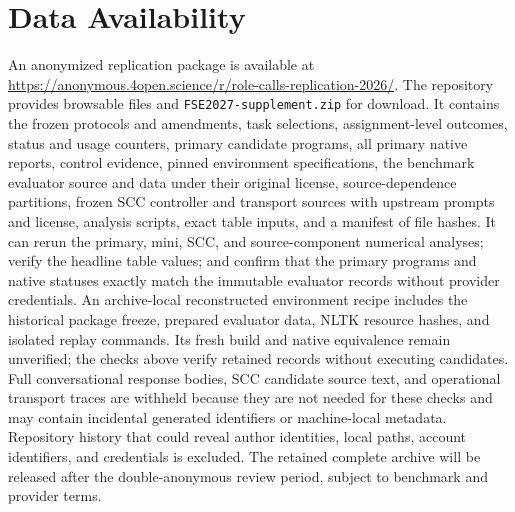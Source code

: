 \section*{Data Availability}
An anonymized replication package is available at \url{https://anonymous.4open.science/r/role-calls-replication-2026/}. The repository provides browsable files and \texttt{FSE2027-supplement.zip} for download. It contains the frozen protocols and amendments, task selections, assignment-level outcomes, status and usage counters, primary candidate programs, all primary native reports, control evidence, pinned environment specifications, the benchmark evaluator source and data under their original license, source-dependence partitions, frozen SCC controller and transport sources with upstream prompts and license, analysis scripts, exact table inputs, and a manifest of file hashes. It can rerun the primary, mini, SCC, and source-component numerical analyses; verify the headline table values; and confirm that the primary programs and native statuses exactly match the immutable evaluator records without provider credentials. An archive-local reconstructed environment recipe includes the historical package freeze, prepared evaluator data, NLTK resource hashes, and isolated replay commands. Its fresh build and native equivalence remain unverified; the checks above verify retained records without executing candidates. Full conversational response bodies, SCC candidate source text, and operational transport traces are withheld because they are not needed for these checks and may contain incidental generated identifiers or machine-local metadata. Repository history that could reveal author identities, local paths, account identifiers, and credentials is excluded. The retained complete archive will be released after the double-anonymous review period, subject to benchmark and provider terms.

